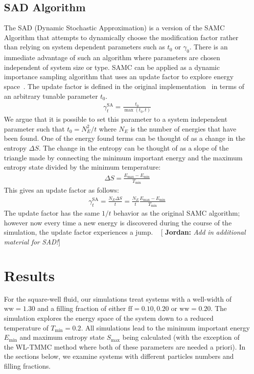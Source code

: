 \documentclass[letterpaper,twocolumn,amsmath,amssymb,pre,aps,10pt]{revtex4-1}
\newcommand{\blue}[1]{{\bf \color{blue} #1}}
\newcommand{\jpsays}[1]{{\color{red} [\blue{Jordan:} \emph{#1}]}}
\begin{document}
\subsection{SAD Algorithm}
The SAD (Dynamic Stochastic Approximation) is a version of the SAMC
Algorithm that attempts to dynamically choose the modification factor
rather than relying on system dependent parameters such as $t_0$ or
$\gamma_0$.  There is an immediate advantage of such an algorithm where
parameters are chosen independent of system size or type. SAMC can be
applied as a dynamic importance sampling algorithm that uses an update
factor to explore energy space~\cite{liang2007stochastic,
werlich2015stochastic, schneider2017convergence}.  The update factor is
defined in the original implementation~\cite{liang2007stochastic} in
terms of an arbitrary tunable parameter $t_0$.
\begin{align}
\gamma_{t}^{\text{SA}} = \frac{t_0}{\max(t_0,t)}
\end{align}
We argue that it is possible to set this parameter to a system
independent parameter such that $t_0 = N_E^2/t$ where $N_E$ is the
number of energies that have been found.  One of the energy found terms
can be thought of as a change in the entropy $\Delta S$.  The change in
the entropy can be thought of as a slope of the triangle made by
connecting the minimum important energy and the maximum entropy state
divided by the minimum temperature:
\begin{align}
\Delta S = \frac{E_{\text{max}}-E_{\text{min}}}{T_{\text{min}}}
\end{align}
This gives an update factor as follows:
\begin{align}
\gamma_{t}^{\text{SA}} = \frac{N_E\Delta S}{t} =
\frac{N_E}{t}\frac{E_{\text{max}}-E_{\text{min}}}{T_{\text{min}}}
\end{align}
The update factor has the same $1/t$ behavior as the original SAMC
algorithm; however now every time a new energy is discovered during the
course of the simulation, the update factor experiences a jump.
~\jpsays{Add in additional material for SAD!}

\section{Results}

For the square-well fluid, our simulations treat systems with a
well-width of $\text{ww} = 1.30$ and a filling fraction of either
$\text{ff} = 0.10, 0.20$ or $\text{ww} = 0.20$.  The simulation explores the
energy space of the system down to a reduced temperature of
$T_{\text{min}} = 0.2$.  All simulations lead to the minimum important
energy $E_{\text{min}}$ and maximum entropy state $S_{\text{max}}$
being calculated (with the exception of the WL-TMMC method where both
of these parameters are needed a priori).  In the sections below, we
examine systems with different particles numbers and filling fractions.
\end{document}
